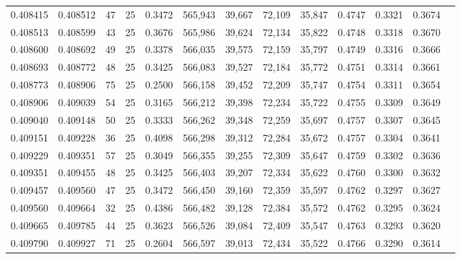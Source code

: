 \begin{tabular}{rrrrrrrrrrrrr}
0.408415 & 0.408512 &    47 &  25 &                                     0.3472 & 565,943 &  39,667 &  72,109 &  35,847 & 0.4747 & 0.3321 & 0.3674 \\
0.408513 & 0.408599 &    43 &  25 &                                     0.3676 & 565,986 &  39,624 &  72,134 &  35,822 & 0.4748 & 0.3318 & 0.3670 \\
0.408600 & 0.408692 &    49 &  25 &                                     0.3378 & 566,035 &  39,575 &  72,159 &  35,797 & 0.4749 & 0.3316 & 0.3666 \\
0.408693 & 0.408772 &    48 &  25 &                                     0.3425 & 566,083 &  39,527 &  72,184 &  35,772 & 0.4751 & 0.3314 & 0.3661 \\
0.408773 & 0.408906 &    75 &  25 &                                     0.2500 & 566,158 &  39,452 &  72,209 &  35,747 & 0.4754 & 0.3311 & 0.3654 \\
0.408906 & 0.409039 &    54 &  25 &                                     0.3165 & 566,212 &  39,398 &  72,234 &  35,722 & 0.4755 & 0.3309 & 0.3649 \\
0.409040 & 0.409148 &    50 &  25 &                                     0.3333 & 566,262 &  39,348 &  72,259 &  35,697 & 0.4757 & 0.3307 & 0.3645 \\
0.409151 & 0.409228 &    36 &  25 &                                     0.4098 & 566,298 &  39,312 &  72,284 &  35,672 & 0.4757 & 0.3304 & 0.3641 \\
0.409229 & 0.409351 &    57 &  25 &                                     0.3049 & 566,355 &  39,255 &  72,309 &  35,647 & 0.4759 & 0.3302 & 0.3636 \\
0.409351 & 0.409455 &    48 &  25 &                                     0.3425 & 566,403 &  39,207 &  72,334 &  35,622 & 0.4760 & 0.3300 & 0.3632 \\
0.409457 & 0.409560 &    47 &  25 &                                     0.3472 & 566,450 &  39,160 &  72,359 &  35,597 & 0.4762 & 0.3297 & 0.3627 \\
0.409560 & 0.409664 &    32 &  25 &                                     0.4386 & 566,482 &  39,128 &  72,384 &  35,572 & 0.4762 & 0.3295 & 0.3624 \\
0.409665 & 0.409785 &    44 &  25 &                                     0.3623 & 566,526 &  39,084 &  72,409 &  35,547 & 0.4763 & 0.3293 & 0.3620 \\
0.409790 & 0.409927 &    71 &  25 &                                     0.2604 & 566,597 &  39,013 &  72,434 &  35,522 & 0.4766 & 0.3290 & 0.3614 \\

\end{tabular}
